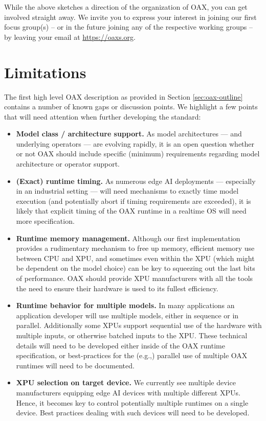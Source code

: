\documentclass{article}
\newcommand{\oaxweb}{\href{https://oaxs.org}{https://oaxs.org}}
\begin{document}
While the above sketches a direction of the organization of OAX, you can get involved straight away. We invite you to express your interest in joining our first focus group(s) -- or in the future joining any of the respective working groups -- by leaving your email at \oaxweb.

\section{Limitations}

The first high level OAX  description as provided in Section \ref{sec:oax-outline} contains a number of known gaps or discussion points. We highlight a few points that will need attention when further developing the standard:

\begin{itemize}
\item \textbf{Model class / architecture support.} As model architectures --- and underlying operators --- are evolving rapidly, it is an open question whether or not OAX should include specific (minimum) requirements regarding model architecture or operator support.
\item \textbf{(Exact) runtime timing.} As numerous edge AI deployments --- especially in an industrial setting --- will need mechanisms to exactly time model execution (and potentially abort if timing requirements are exceeded), it is likely that explicit timing of the OAX runtime in a realtime OS will need more specification.
\item \textbf{Runtime memory management.} Although our first implementation provides a rudimentary mechanism to free up memory, efficient memory use between CPU and XPU, and sometimes even within the XPU (which might be dependent on the model choice) can be key to squeezing out the last bits of performance. OAX should provide XPU manufacturers with all the tools the need to ensure their hardware is used to its fullest efficiency.
\item \textbf{Runtime behavior for multiple models.} In many applications an application developer will use multiple models, either in sequence or in parallel. Additionally some XPUs support sequential use of the hardware with multiple inputs, or otherwise batched inputs to the XPU. These technical details will need to be developed either inside of the OAX runtime specification, or best-practices for the (e.g.,) parallel use of multiple OAX runtimes will need to be documented.
\item \textbf{XPU selection on target device.} We currently see multiple device manufacturers equipping edge AI devices with multiple different XPUs. Hence, it becomes key to control potentially multiple runtimes on a single device. Best practices dealing with such devices will need to be developed.
\end{itemize}
\end{document}
